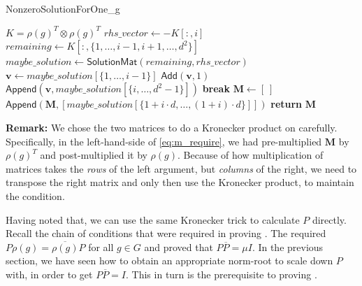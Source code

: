 \documentclass[11pt]{article}
\begin{document}
\begin{algorithm}
  \caption{NonzeroSolutionForOne\_g}
  \label{alg:nonzero}
  \begin{algorithmic}
    \State $K = \rho(g)^T \otimes \rho(g)^T$ 
      \State $rhs\_vector \gets -K[:,i]$ 
      \State $remaining \gets K[:,\{1, \ldots, i-1, i+1, \ldots, d^2\}]$ 
      \State $maybe\_solution \gets \textsf{SolutionMat}(remaining, rhs\_vector)$
       
        \State $\mathbf{v} \gets maybe\_solution[\{1, \ldots, i-1\}]$
        \State $\textsf{Add}(\mathbf{v}, 1)$ 
        \State $\textsf{Append}(\mathbf{v},maybe\_solution[\{i, \ldots, d^2-1\}])$
        \State \textbf{break}
      \EndIf
    \EndFor
    \State $\mathbf{M} \gets [~]$ 
      \State $\textsf{Append}(\mathbf{M}, [maybe\_solution[\{1+i\cdot d, \ldots, (1+i)\cdot d\}]])$
    \EndFor
    \State \textbf{return} $\mathbf{M}$
  \end{algorithmic}
\end{algorithm}

\textbf{Remark:} We chose the two matrices to do a Kronecker product on carefully. Specifically,
in the left-hand-side of \cref{eq:m_require}, we had pre-multiplied $\mathbf{M}$ by $\rho(g)^T$
and post-multiplied it by $\rho(g)$. Because of how multiplication of matrices takes the \textit{rows}
of the left argument, but \textit{columns} of the right, we need to transpose the right matrix
and only then use the Kronecker product, to maintain the condition.

Having noted that, we can use the same Kronecker trick to calculate $P$ directly. Recall the chain
of conditions that were required in proving \cite[Lemma 3.2, 3.3]{Pas21}. The \cite[Lemma 3.2]{Pas21}
required $P\rho(g) = \overline{\rho(g)}P$ for all $g\in G$ and proved that
$P\overline{P} = \mu I$. In the previous section, we have seen how to obtain an
appropriate norm-root to scale down $P$ with, in order to get $P\overline{P} = I$.
This in turn is the prerequisite to proving \cite[Lemma 3.3]{Pas21}.
\end{document}
